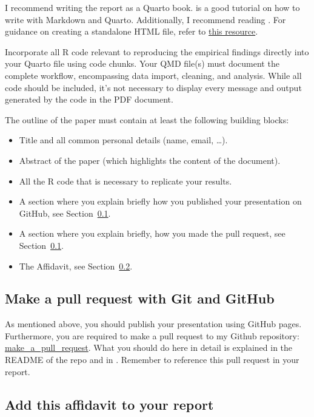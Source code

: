 \documentclass[
  a4paper,
  onecolumn,
  oneside]{scrartcl}
\providecommand{\tightlist}{%
  \setlength{\itemsep}{0pt}\setlength{\parskip}{0pt}}\usepackage{longtable,booktabs,array}
\begin{document}
I recommend writing the report as a Quarto book.
\citet{Telford2023Markdown} is a good tutorial on how to write with
Markdown and Quarto. Additionally, I recommend reading
\citet{Huber2024Data}. For guidance on creating a standalone HTML file,
refer to
\href{https://quarto.org/docs/output-formats/html-publishing.html\#standalone-html}{this
resource}.

Incorporate all R code relevant to reproducing the empirical findings
directly into your Quarto file using code chunks. Your QMD file(s) must
document the complete workflow, encompassing data import, cleaning, and
analysis. While all code should be included, it's not necessary to
display every message and output generated by the code in the PDF
document.

The outline of the paper must contain at least the following building
blocks:

\begin{itemize}
\tightlist
\item
  Title and all common personal details (name, email, \ldots).
\item
  Abstract of the paper (which highlights the content of the document).
\item
  All the R code that is necessary to replicate your results.
\item
  A section where you explain briefly how you published your
  presentation on GitHub, see Section~\ref{sec-gitgithub}.
\item
  A section where you explain briefly, how you made the pull request,
  see Section~\ref{sec-gitgithub}.
\item
  The Affidavit, see Section~\ref{sec-affidavit}.
\end{itemize}

\subsection{Make a pull request with Git and
GitHub}\label{sec-gitgithub}

As mentioned above, you should publish your presentation using GitHub
pages. Furthermore, you are required to make a pull request to my Github
repository:
\href{https://github.com/hubchev/make_a_pull_request}{make\_a\_pull\_request}.
What you should do here in detail is explained in the README of the repo
and in \citet{Huber2024Data}. Remember to reference this pull request in
your report.

\subsection{Add this affidavit to your report}\label{sec-affidavit}
\end{document}
